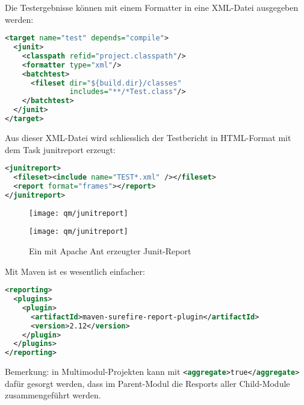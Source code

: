 \newslide
Die Testergebnisse können mit einem Formatter in eine XML-Datei ausgegeben
werden:
\begin{lstlisting}[language=xml,
  morekeywords={target,formatter,junit,classpath,batchtest,fileset}]
<target name="test" depends="compile">
  <junit>
    <classpath refid="project.classpath"/>
    <formatter type="xml"/>
    <batchtest>
      <fileset dir="${build.dir}/classes"
               includes="**/*Test.class"/>
    </batchtest>
  </junit>
</target>
\end{lstlisting}
\newslide
Aus dieser XML-Datei wird schliesslich
der Testbericht in HTML-Format mit dem Task junitreport erzeugt:
\begin{lstlisting}[language=xml,morekeywords={junitreport,report,fileset}]
<junitreport>
  <fileset><include name="TEST*.xml" /></fileset>
  <report format="frames"></report>
</junitreport>
\end{lstlisting}
\begin{figure}[H]
\ifslides
\begin{center}
\texttt{[image: qm/junitreport]}
\end{center}
\else
\texttt{[image: qm/junitreport]}
\fi
\caption{Ein mit Apache Ant erzeugter Junit-Report}
\end{figure}
%
%
%
%
%
%
\newslide
Mit Maven ist es wesentlich einfacher:
\begin{lstlisting}[language=xml,
  morekeywords={reporting,plugins,plugin,artifactId}]
<reporting>
  <plugins>
    <plugin>
      <artifactId>maven-surefire-report-plugin</artifactId>
      <version>2.12</version>
    </plugin>
  </plugins>
</reporting>
\end{lstlisting}
Bemerkung: in Multimodul-Projekten kann mit
\lstinline[language=xml]{<aggregate>true</aggregate>}
dafür gesorgt werden, dass im
Parent-Modul die Resports aller Child-Module zusammengeführt werden.
%
\newslide
